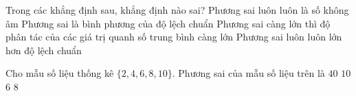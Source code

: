 

\begin{ex}%
	Trong các khẳng định  sau, khẳng định nào sai?
	 \choice
		{Phương sai luôn  luôn là số không âm}
		{Phương sai là  bình phương của độ lệch chuẩn}
		{Phương sai càng lớn thì độ phân tác của các giá trị quanh số trung bình càng  lớn}
		{\True Phương sai  luôn luôn lớn hơn độ lệch chuẩn}
\end{ex}

\begin{ex}%
	Cho mẫu số liệu thống kê $\{2,4,6,8,10\}$. Phương sai của mẫu số liệu  trên là
	\choice 
		 {$40$}
		{$10$} 
		 {$6$}
		{\True  $8$}
\end{ex}

